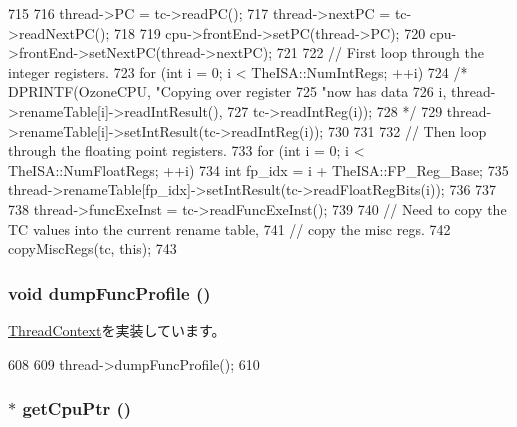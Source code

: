 \begin{DoxyCode}
715 {
716     thread->PC = tc->readPC();
717     thread->nextPC = tc->readNextPC();
718 
719     cpu->frontEnd->setPC(thread->PC);
720     cpu->frontEnd->setNextPC(thread->nextPC);
721 
722     // First loop through the integer registers.
723     for (int i = 0; i < TheISA::NumIntRegs; ++i) {
724 /*        DPRINTF(OzoneCPU, "Copying over register %
725                 "now has data %
726                 i, thread->renameTable[i]->readIntResult(),
727                 tc->readIntReg(i));
728 */
729         thread->renameTable[i]->setIntResult(tc->readIntReg(i));
730     }
731 
732     // Then loop through the floating point registers.
733     for (int i = 0; i < TheISA::NumFloatRegs; ++i) {
734         int fp_idx = i + TheISA::FP_Reg_Base;
735         thread->renameTable[fp_idx]->setIntResult(tc->readFloatRegBits(i));
736     }
737 
738     thread->funcExeInst = tc->readFuncExeInst();
739 
740     // Need to copy the TC values into the current rename table,
741     // copy the misc regs.
742     copyMiscRegs(tc, this);
743 }
\end{DoxyCode}
\hypertarget{classOzoneCPU_1_1OzoneTC_a13fa12d1779a94a1e0b968946a1367c7}{
\subsubsection[{dumpFuncProfile}]{\setlength{\rightskip}{0pt plus 5cm}void dumpFuncProfile ()}}
\label{classOzoneCPU_1_1OzoneTC_a13fa12d1779a94a1e0b968946a1367c7}


\hyperlink{classThreadContext_ae3f0b63a85470c17e675083487febead}{ThreadContext}を実装しています。


\begin{DoxyCode}
608 {
609     thread->dumpFuncProfile();
610 }
\end{DoxyCode}
\hypertarget{classOzoneCPU_1_1OzoneTC_a55c840745aa3c52362144a0ef54d175c}{
\subsubsection[{getCpuPtr}]{ $\ast$ getCpuPtr ()}}
\label{classOzoneCPU_1_1OzoneTC_a55c840745aa3c52362144a0ef54d175c}


